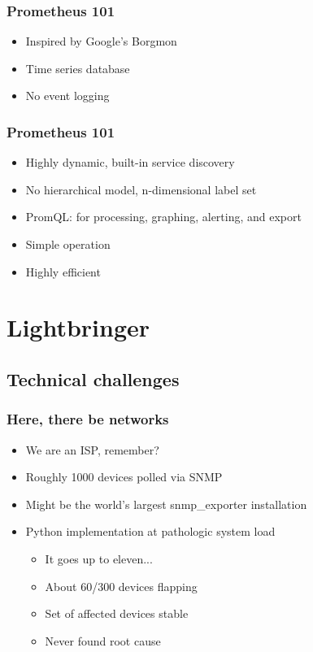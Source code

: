 \documentclass[t]{beamer}
\begin{document}
\begin{frame}
	\frametitle{Prometheus 101}
	\begin{itemize}
		\item Inspired by Google's Borgmon
		\item Time series database
		\item No event logging
	\end{itemize}
\end{frame}

\begin{frame}
	\frametitle{Prometheus 101}
	\begin{itemize}
		\item Highly dynamic, built-in service discovery
		\item No hierarchical model, n-dimensional label set
		\item PromQL: for processing, graphing, alerting, and export
		\item Simple operation
		\item Highly efficient
	\end{itemize}
\end{frame}




\section{Lightbringer}

\subsection{Technical challenges}

\begin{frame}
	\frametitle{Here, there be networks}
	\begin{itemize}
		\item We are an ISP, remember?
		\item Roughly 1000 devices polled via SNMP
		\item Might be the world's largest snmp\_exporter installation
		\item Python implementation at pathologic system load
		\begin{itemize}
			\item It goes up to eleven...
			\item About 60/300 devices flapping
			\item Set of affected devices stable
			\item Never found root cause
		\end{itemize}
	\end{itemize}
\end{frame}
\end{document}
